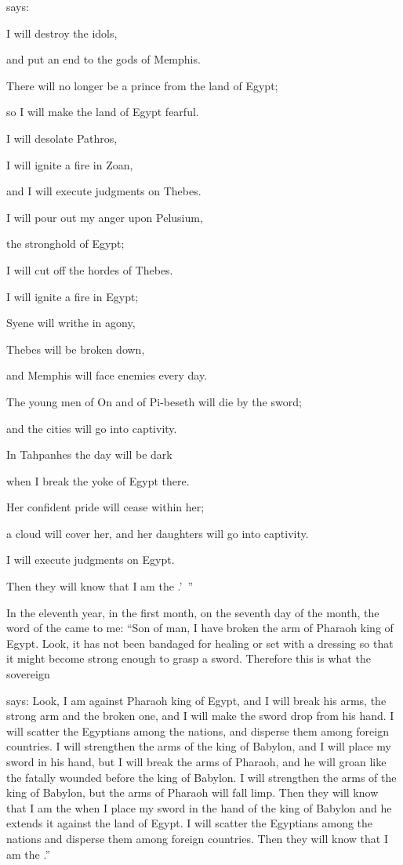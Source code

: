 {{}
says:
\par }{\Q I will destroy
the idols,
\par }{\Q and put an end
to the gods
of Memphis.
\par }{\Q There will no
longer
be a prince
from the land
of Egypt;
\par }{\Q so I will make
the land
of Egypt
fearful.
\par }{\Q {}I will desolate
Pathros,
\par }{\Q I
will ignite
a fire
in Zoan,
\par }{\Q and I will execute
judgments
on Thebes.
\par }{\Q {}I will pour out
my anger
upon
Pelusium,
\par }{\Q the stronghold
of Egypt;
\par }{\Q I will cut off
the hordes
of Thebes.
\par }{\Q {}I will ignite
a fire
in Egypt;
\par }{\Q Syene
will writhe
in agony,
\par }{\Q Thebes
will be
broken down,
\par }{\Q and Memphis
will face enemies
every day.
\par }{\Q {}The young men
of On
and of Pi-beseth
will die
by the sword;
\par }{\Q and the cities will go
into captivity.
\par }{\Q {}In Tahpanhes
the day
will be dark
\par }{\Q when I break
the yoke
of Egypt
there.
\par }{\Q Her confident
pride
will cease
within her;
\par }{\Q a cloud
will cover
her, and her daughters
will go
into captivity.
\par }{\Q {}I will execute
judgments
on Egypt.
\par }{\Q Then they will know
that
I am
the {}.’ ”
\par }{\PP {}In the eleventh
year,
in the first
month, on the seventh
day of the month,
the word
of the {}
came to me:
“Son
of man,
I have broken
the arm
of Pharaoh
king
of Egypt.
Look,
it has not
been bandaged
for healing
or set
with a dressing so that it might become strong
enough to grasp
a sword.
Therefore
this is what
the sovereign

{}
says: Look,
I am against Pharaoh
king
of Egypt,
and I will break
his arms,
the strong
arm and the broken
one, and I will make
the sword
drop
from his hand.
I will scatter
the Egyptians
among the nations,
and disperse
them among foreign countries.
I will strengthen
the arms
of the king
of Babylon,
and I will place
my sword
in his hand,
but I will break
the arms
of Pharaoh,
and he will groan
like the fatally
wounded
before the king of Babylon.
I will strengthen
the
arms
of the king
of Babylon,
but the arms
of Pharaoh
will fall
limp. Then they will know
that
I am
the {}
when I place
my sword
in the hand
of the king
of Babylon
and he extends
it against the land
of Egypt.
I will scatter
the Egyptians
among the nations
and disperse
them among foreign countries.
Then they will know
that
I am
the {}.”

}
